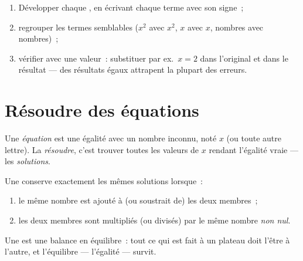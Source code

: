 \begin{method}\label{met:g8:equations:reduce}
\begin{enumerate}
  \item Développer chaque , en écrivant chaque terme avec son
        signe~;
  \item regrouper les termes semblables ($x^2$ avec $x^2$, $x$ avec
        $x$, nombres avec nombres)~;
  \item vérifier avec une valeur~: substituer par ex.\ $x = 2$ dans
        l'original et dans le résultat --- des résultats égaux
        attrapent la plupart des erreurs.
\end{enumerate}
\end{method}

\section{Résoudre des équations}

\begin{definition}[Équation]\label{def:g8:equations:def}
Une \emph{équation} est une égalité avec un nombre
inconnu, noté $x$ (ou toute autre lettre). La \emph{résoudre}, c'est
trouver toutes les valeurs de $x$ rendant l'égalité vraie --- les
\emph{solutions}.
\end{definition}

\begin{theorem}\label{thm:g8:equations:balance}
Une  conserve exactement les mêmes solutions lorsque~:
\begin{enumerate}
  \item le même nombre est ajouté à (ou soustrait de) les deux
        membres~;
  \item les deux membres sont multipliés (ou divisés) par le même
        nombre \emph{non nul}.
\end{enumerate}
\end{theorem}
\admitted

\begin{omfigure}

{\small Une  est une balance en équilibre~: tout ce qui est
fait à un plateau doit l'être à l'autre, et l'équilibre ---
l'égalité --- survit.}
\end{omfigure}


